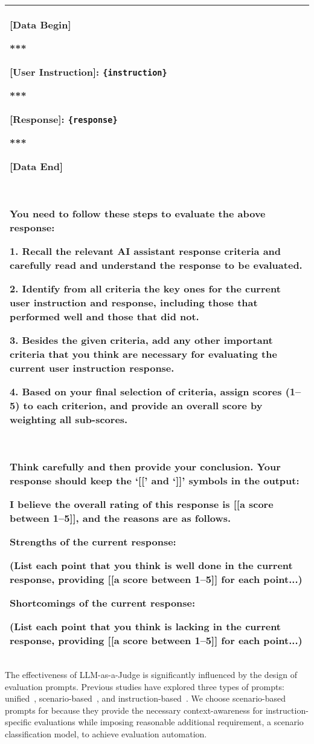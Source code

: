 \begin{table}[tbh!]
\begin{tabularx}{.48\textwidth}{X}
        [Data Begin] 
        
        ***
        
        [User Instruction]: \texttt{\{instruction\}} 
        
        *** 
        
        [Response]: \texttt{\{response\}}
        
        ***
        
        [Data End] 

        \
        
        You need to follow these steps to evaluate the above response: 
        
        1. Recall the relevant AI assistant response criteria and carefully read and understand the response to be evaluated.
        
        2. Identify from all criteria the key ones for the current user instruction and response, including those that performed well and those that did not. 
        
        3. Besides the given criteria, add any other important criteria that you think are necessary for evaluating the current user instruction response. 
        
        4. Based on your final selection of criteria, assign scores (1--5) to each criterion, and provide an overall score by weighting all sub-scores. 

        \ 
        
        Think carefully and then provide your conclusion. Your response should keep the `[[' and `]]' symbols in the output: 
        
        I believe the overall rating of this response is [[a score between 1--5]], and the reasons are as follows. 
        
        Strengths of the current response: 
        
        (List each point that you think is well done in the current response, providing [[a score between 1--5]] for each point...) 
        
        Shortcomings of the current response: 
        
        (List each point that you think is lacking in the current response, providing [[a score between 1--5]] for each point...)  \\
    \bottomrule
  \end{tabularx}
\end{table}

The effectiveness of LLM-as-a-Judge is significantly influenced by the design of evaluation prompts. Previous studies have explored three types of prompts: unified~\cite{zheng2023judging,lin2024RethinkingAlignment}, scenario-based~\cite{ke2024critiquellm,li2023autoj}, and instruction-based~\cite{lin2024wildbench}. 
We choose scenario-based prompts for \modelname because they provide the necessary context-awareness for instruction-specific evaluations while imposing reasonable additional requirement, \ie a scenario classification model, to achieve evaluation automation.

